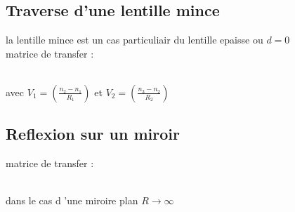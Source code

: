 \documentclass[12pt]{book}
\begin{document}
        \subsection{Traverse d'une lentille mince}
            la lentille mince est un cas particuliair du lentille epaisse ou $d=0$
            \\ matrice de transfer :
            \begin{center}
                 \\ avec $V_1 = (\frac{n_2 - n_1}{R_1})$ et $V_2 = (\frac{n_3 - n_2}{R_2})$
            \end{center} 
        \subsection{Reflexion sur un miroir}
            matrice de transfer :
            \begin{center}
                 \\ dans le cas d 'une miroire plan $R \to \infty$
            \end{center} 
\end{document}
